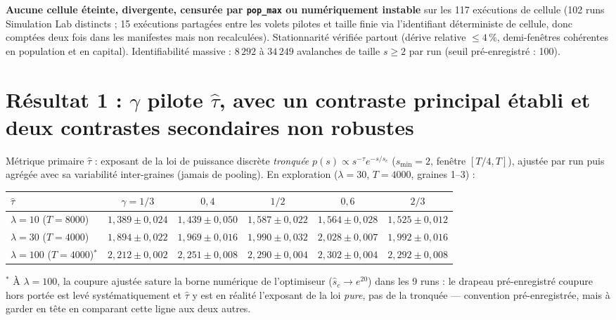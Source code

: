 \documentclass[11pt,a4paper]{article}
\newcommand{\code}[1]{\texttt{#1}}
\begin{document}
\textbf{Aucune cellule éteinte, divergente, censurée par \code{pop\_max}
ou numériquement instable} sur les 117 exécutions de cellule (102 runs
Simulation Lab distincts ; 15 exécutions partagées entre les volets
pilotes et taille finie via l'identifiant déterministe de cellule, donc
comptées deux fois dans les manifestes mais non recalculées).
Stationnarité vérifiée partout (dérive relative $\le4\,\%$, demi-fenêtres
cohérentes en population et en capital). Identifiabilité massive :
$8\,292$ à $34\,249$ avalanches de taille $s\ge2$ par run (seuil
pré-enregistré : 100).

\section{Résultat 1 : $\gamma$ pilote $\hat\tau$, avec un contraste
principal établi et deux contrastes secondaires non robustes}

Métrique primaire $\hat\tau$ : exposant de la loi de puissance discrète
\emph{tronquée} $p(s)\propto s^{-\tau}e^{-s/s_c}$ ($s_{\min}=2$, fenêtre
$[T/4,T]$), ajustée par run puis agrégée avec sa variabilité
inter-graines (jamais de pooling). En exploration ($\lambda=30$,
$T=4000$, graines 1--3) :

\begin{center}
\begin{tabular}{lccccc}
\toprule
$\hat\tau$ & $\gamma=1/3$ & $0{,}4$ & $1/2$ & $0{,}6$ & $2/3$\\
\midrule
$\lambda=10$ ($T{=}8000$) & $1{,}389\pm0{,}024$ & $1{,}439\pm0{,}050$ & $1{,}587\pm0{,}022$ & $1{,}564\pm0{,}028$ & $1{,}525\pm0{,}012$\\
$\lambda=30$ ($T{=}4000$) & $1{,}894\pm0{,}022$ & $1{,}969\pm0{,}016$ & $1{,}990\pm0{,}032$ & $2{,}028\pm0{,}007$ & $1{,}992\pm0{,}016$\\
$\lambda=100$ ($T{=}4000$)$^{*}$ & $2{,}212\pm0{,}002$ & $2{,}251\pm0{,}008$ & $2{,}290\pm0{,}004$ & $2{,}302\pm0{,}004$ & $2{,}292\pm0{,}008$\\
\bottomrule
\end{tabular}
\end{center}
{\footnotesize $^{*}$ À $\lambda=100$, la coupure ajustée sature la borne
numérique de l'optimiseur ($\hat s_c\to e^{20}$) dans les 9 runs : le
drapeau pré-enregistré \og coupure hors portée \fg{} est levé
systématiquement et $\hat\tau$ y est en réalité l'exposant de la loi
\emph{pure}, pas de la tronquée --- convention pré-enregistrée, mais à
garder en tête en comparant cette ligne aux deux autres.}
\end{document}
